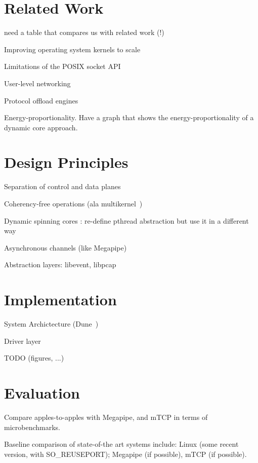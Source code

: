 


\section{Related Work}

\todo need a table that compares us with related work (!)

\todo Improving operating system kernels to scale

\todo Limitations of the POSIX socket API

\todo User-level networking

\todo Protocol offload engines

\todo Energy-proportionality.   Have a graph that shows the energy-proportionality of a dynamic core approach.


\section{Design Principles}



\todo Separation of control and data planes

\todo Coherency-free operations  (ala multikernel~\cite{DBLP:conf/sosp/BaumannBDHIPRSS09})

\todo Dynamic spinning cores : re-define pthread abstraction but use it in a different way

\todo Asynchronous channels (like Megapipe)

\todo Abstraction layers: libevent, libpcap


\section{Implementation}



\todo System Archictecture (Dune~\cite{belay2012dune})

\todo Driver layer

\todo TODO (figures, ...)

\section{Evaluation}


\todo Compare apples-to-apples with Megapipe, and mTCP in terms of microbenchmarks.

\todo Baseline comparison of state-of-the art systems include:  Linux (some recent version, with SO\_REUSEPORT); Megapipe (if possible), mTCP (if possible). 

